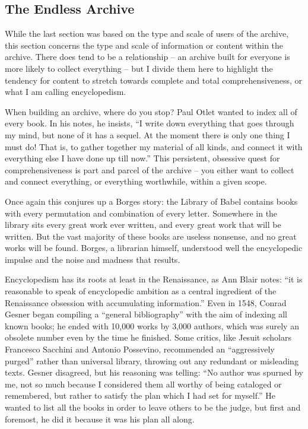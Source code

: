 \subsection{The Endless Archive}

While the last section was based on the type and scale of users of the archive, this section concerns the type and scale of information or content within the archive. There does tend to be a relationship – an archive built for everyone is more likely to collect everything – but I divide them here to highlight the tendency for content to stretch towards complete and total comprehensiveness, or what I am calling encyclopedism.

When building an archive, where do you stop? Paul Otlet wanted to index all of every book. In his notes, he insists, “I write down everything that goes through my mind, but none of it has a sequel. At the moment there is only one thing I must do! That is, to gather together my material of all kinds, and connect it with everything else I have done up till now.”  This persistent, obsessive quest for comprehensiveness is part and parcel of the archive – you either want to collect and connect everything, or everything worthwhile, within a given scope.

Once again this conjures up a Borges story: the Library of Babel contains books with every permutation and combination of every letter. Somewhere in the library sits every great work ever written, and every great work that will be written. But the vast majority of these books are useless nonsense, and no great works will be found. Borges, a librarian himself, understood well the encyclopedic impulse and the noise and madness that results. 

Encyclopedism has its roots at least in the Renaissance, as Ann Blair notes: “it is reasonable to speak of encyclopedic ambition as a central ingredient of the Renaissance obsession with accumulating information.”  Even in 1548, Conrad Gesner began compiling a “general bibliography” with the aim of indexing all known books; he ended with 10,000 works by 3,000 authors, which was surely an obsolete number even by the time he finished.  Some critics, like Jesuit scholars Francesco Sacchini and Antonio Possevino, recommended an “aggressively purged” rather than universal library, throwing out any redundant or misleading texts. Gesner disagreed, but his reasoning was telling: “No author was spurned by me, not so much because I considered them all worthy of being cataloged or remembered, but rather to satisfy the plan which I had set for myself.”  He wanted to list all the books in order to leave others to be the judge, but first and foremost, he did it because it was his plan all along.


